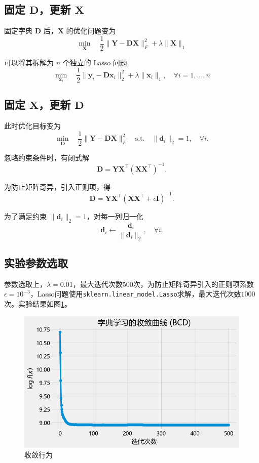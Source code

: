 \documentclass{homework}
\begin{document}
\question

\begin{sol}


\subsection*{固定 $\mathbf{D}$，更新 $\mathbf{X}$}

固定字典 $\mathbf{D}$ 后，$\mathbf{X}$ 的优化问题变为
\[
\min_{\mathbf{X}} \quad  \frac{1}{2} \|\mathbf{Y} - \mathbf{D}\mathbf{X}\|_F^2 + \lambda \|\mathbf{X}\|_1
\]

可以将其拆解为 $n$ 个独立的 Lasso 问题
\[
\min_{\mathbf{x}_i} \quad  \frac{1}{2} \|\mathbf{y}_i - \mathbf{D} \mathbf{x}_i\|_2^2 + \lambda \|\mathbf{x}_i\|_1, \quad \forall i = 1, \dots, n
\]

\subsection*{固定 $\mathbf{X}$，更新 $\mathbf{D}$}

此时优化目标变为
\[
\min_{\mathbf{D}} \quad \frac{1}{2} \|\mathbf{Y} - \mathbf{D} \mathbf{X}\|_F^2 \quad \text{s.t.} \quad  \|\mathbf{d}_i\|_2 = 1, \quad \forall i.
\]

忽略约束条件时，有闭式解
\[
\mathbf{D} = \mathbf{Y} \mathbf{X}^\top (\mathbf{X} \mathbf{X}^\top)^{-1}.
\]

为防止矩阵奇异，引入正则项，得
\[
\mathbf{D} = \mathbf{Y} \mathbf{X}^\top (\mathbf{X} \mathbf{X}^\top + \epsilon \mathbf{I})^{-1}.
\]

为了满足约束 $\|\mathbf{d}_i\|_2 = 1$，对每一列归一化
\[
\mathbf{d}_i \leftarrow \frac{\mathbf{d}_i}{\|\mathbf{d}_i\|_2}, \quad \forall i.
\]

\subsection*{实验参数选取}

参数选取上，$\lambda = 0.01$，最大迭代次数$500$次，为防止矩阵奇异引入的正则项系数$\epsilon = 10^{-3}$，Lasso问题使用\texttt{sklearn.linear\_model.Lasso}求解，最大迭代次数$1000$次。实验结果如图\ref{fig:1}。

\begin{figure}[h]
    \centering
    \includegraphics[width=0.5\linewidth]{1.png}
    \caption{收敛行为}
    \label{fig:1}
\end{figure}
\end{sol}
\end{document}
